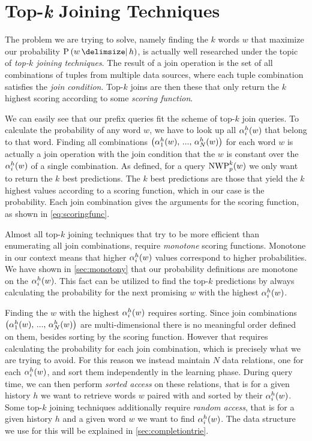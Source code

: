 \section{Top-\emph{k} Joining Techniques}
\label{sec:topkjoin}

The problem we are trying to solve, namely finding the $k$ words $w$ that
maximize our probability $\Prob{w}{h}$, is actually well researched under the
topic of \emph{top-$k$ joining techniques}.
The result of a join operation is the set of all combinations of tuples from
multiple data sources, where each tuple combination satisfies the \emph{join
condition}.
Top-$k$ joins are then these that only return the $k$ highest scoring
according to some \emph{scoring function}.

We can easily see that our prefix queries fit the scheme of top-$k$ join
queries.
To calculate the probability of any word $w$, we have to look up all
$\alpha^h_i(w)$ that belong to that word.
Finding all combinations
$\left(\alpha^h_1(w), \, ..., \, \alpha^h_N(w)\right)$
for each word $w$ is actually a join operation with the join condition that
the $w$ is constant over the $\alpha^h_i(w)$ of a single combination.
As defined, for a query $\NWP[p][k]{w}$ we only want to return the $k$ best
predictions.
The $k$ best predictions are those that yield the $k$ highest values according
to a scoring function, which in our case is the probability.
Each join combination gives the arguments for the scoring function, as shown
in \cref{eq:scoringfunc}.

Almost all top-$k$ joining techniques that try to be more efficient than
enumerating all join combinations, require \emph{monotone} scoring functions.
Monotone in our context means that higher $\alpha^h_i(w)$ values correspond
to higher probabilities.
We have shown in \cref{sec:monotony} that our probability definitions are
monotone on the $\alpha^h_i(w)$.
This fact can be utilized to find the top-$k$ predictions by always calculating
the probability for the next promising $w$ with the highest $\alpha^h_i(w)$.

Finding the $w$ with the highest $\alpha^h_i(w)$ requires sorting.
Since join combinations
$\left(\alpha^h_1(w), \, ..., \, \alpha^h_N(w)\right)$ are multi-dimensional
there is no meaningful order defined on them, besides sorting by the scoring
function.
However that requires calculating the probability for each join
combination, which is precisely what we are trying to avoid.
For this reason we instead maintain $N$ data relations, one for each
$\alpha^h_i(w)$, and sort them independently in the learning phase.
During query time, we can then perform \emph{sorted access} on these relations,
that is for a given history $h$ we want to retrieve words $w$ paired with and
sorted by their $\alpha^h_i(w)$.
Some top-$k$ joining techniques additionally require \emph{random access},
that is for a given history $h$ and a given word $w$ we want to find
$\alpha^h_i(w)$.
The data structure we use for this will be explained in
\cref{sec:completiontrie}.

